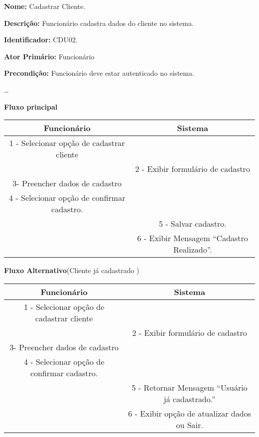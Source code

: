 	\par
	\textbf{Nome:} Cadastrar Cliente.
	\par
	\textbf{Descrição:} Funcionário cadastra dados do cliente no sistema.
	\par 
	\textbf{Identificador:} CDU02.
	\par
	\textbf{Ator Primário:} Funcionário	
	\par
	\textbf{Precondição:} Funcionário deve estar autenticado no sistema.
	\par
	\ldots
	\par
	\textbf{Fluxo principal}\par
	\begin{tabular}{|c|c|}
		\hline 
		Funcionário & Sistema \\ 
		\hline 	
		1 - Selecionar opção de cadastrar cliente &  \\ 
		\hline 
		& 
		
		2 - Exibir formulário de cadastro 
		\\ 
		\hline 
		3- Preencher dados de cadastro
		& 		

		\\ 
		\hline 
		4 - Selecionar opção de confirmar cadastro.
		& 
		
		\\ 
		\hline 
		& 	
		
		5 - Salvar cadastro. 	
		\\ 
		\hline 
		& 
		
		6 - Exibir Mensagem “Cadastro Realizado”.
		\\ 		
		\hline 
	\end{tabular} 
	\vspace{12px}
	\par
	\textbf{Fluxo Alternativo}(Cliente já cadastrado )\par
	\begin{tabular}{|c|c|}
		\hline 
		Funcionário & Sistema \\ 
		\hline 	
		1 - Selecionar opção de cadastrar cliente &  \\ 
		\hline 
		& 
		
		2 - Exibir formulário de cadastro 
		\\ 
		\hline 
		3- Preencher dados de cadastro
		& 		
		
		\\ 
		\hline 
		4 - Selecionar opção de confirmar cadastro.
		& 
		
		\\ 
		\hline 
		& 	
		
		5 - Retornar Mensagem “Usuário já cadastrado.”	
		\\ 
		\hline 
		& 
		
		6 - Exibir opção de atualizar dados  ou Sair.
		\\ 		
		\hline 
	\end{tabular}
	\vspace{12px}


